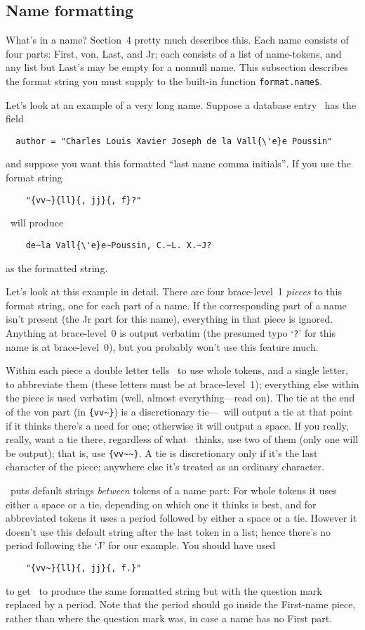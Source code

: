\subsection{Name formatting}

What's in a name?
Section~4 pretty much describes this.
Each name consists of four parts: First, von, Last, and Jr;
each consists of a list of name-tokens,
and any list but Last's may be empty for a nonnull name.
This subsection describes the format string you must supply to
the built-in function \hbox{\tt format.name\$}.

Let's look at an example of a very long name.
Suppose a database entry~\cite{prime-number-theorem} has the field
\begin{verbatim}
  author = "Charles Louis Xavier Joseph de la Vall{\'e}e Poussin"
\end{verbatim}
and suppose you want this formatted ``last name comma initials''$\!$.
If you use the format string
\begin{verbatim}
    "{vv~}{ll}{, jj}{, f}?"
\end{verbatim}
\BibTeX\ will produce
\begin{verbatim}
    de~la Vall{\'e}e~Poussin, C.~L. X.~J?
\end{verbatim}
as the formatted string.

Let's look at this example in detail.
There are four brace-level~1 {\em pieces\/} to this format string,
one for each part of a name.
If the corresponding part of a name isn't present (the Jr part for this name),
everything in that piece is ignored.
Anything at brace-level~0 is output verbatim
(the presumed typo `{\tt ?}' for this name is at brace-level~0),
but you probably won't use this feature much.

Within each piece a double letter tells \BibTeX\ to use whole tokens, and
a single letter, to abbreviate them (these letters must be at brace-level~1);
everything else within the piece is used verbatim
(well, almost everything---read on).
The tie at the end of the von part (in \hbox{\verb|{vv~}|})
is a discretionary tie---\BibTeX\ will output a tie at that point
if it thinks there's a need for one;
otherwise it will output a space.
If you really, really, want a tie there,
regardless of what \BibTeX\ thinks, use two of them
(only one will be output); that is, use \hbox{\verb|{vv~~}|}.
A tie is discretionary only if it's the last character of the piece;
anywhere else it's treated as an ordinary character.

\BibTeX\ puts default strings {\em between\/} tokens of a name part:
For whole tokens it uses either a space or a tie,
depending on which one it thinks is best,
and for abbreviated tokens it uses a period followed by
either a space or a tie.
However it doesn't use this default string after the last token in a list;
hence there's no period following the `J' for our example.
You should have used
\begin{verbatim}
    "{vv~}{ll}{, jj}{, f.}"
\end{verbatim}
to get \BibTeX\ to produce the same formatted string but with the question
mark replaced by a period.
Note that the period should go inside the First-name piece,
rather than where the question mark was, in case a name has no First part.

